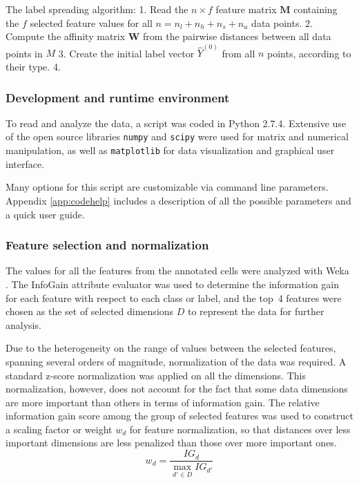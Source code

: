 \documentclass[oneside, a4paper, draft]{memoir} %
\begin{document}
The label spreading algorithm:
1. Read the $n \times f$ feature matrix $\mathbf{M}$ containing the $f$ selected feature values for all
$n = n_l + n_h + n_s + n_u$ data points.
2. Compute the affinity matrix $\textbf{W}$ from the pairwise distances between all data points in $M$
3. Create the initial label vector $\hat{Y}^{(0)}$ from all $n$ points, according to their type.
4. 


\subsubsection{Development and runtime environment}
To read and analyze the data, a script was coded in Python 2.7.4. Extensive use of the open source libraries
\texttt{numpy} and \texttt{scipy} were used for matrix and numerical manipulation, as well as \texttt{matplotlib} for
data visualization and graphical user interface.

Many options for this script are customizable via command line parameters. Appendix \ref{app:codehelp} includes a
description of all the possible parameters and a quick user guide.

\subsubsection{Feature selection and normalization}
The values for all the features from the annotated cells were analyzed with Weka \cite{hall2009weka}. The InfoGain
attribute evaluator was used to determine the information gain for each feature with respect to each class or label,
and the top~4 features were chosen as the set of selected dimensions $D$ to represent the data for
further analysis.

Due to the heterogeneity on the range of values between the selected features, spanning 
several orders of magnitude, normalization of the data was required. A standard z-score normalization was applied on
all the dimensions. This normalization, however, does not account for the fact that some data dimensions are more
important than others in terms of information gain. The relative information gain score among the group of
selected features was used to construct a scaling factor or weight $w_d$ for feature normalization, so that
distances over less important dimensions are less penalized than those over more important ones.
\begin{equation}
	w_d = \frac{IG_d}{\max_{d' \in D} IG_{d'}}
\end{equation}
\end{document}
